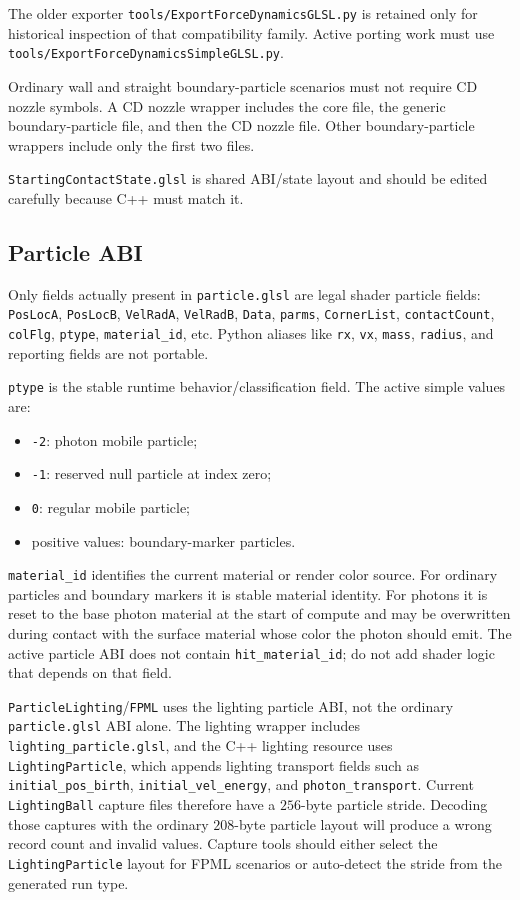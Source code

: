 The older exporter \texttt{tools/ExportForceDynamicsGLSL.py} is retained only
for historical inspection of that compatibility family.  Active porting work
must use \texttt{tools/ExportForceDynamicsSimpleGLSL.py}.

Ordinary wall and straight boundary-particle scenarios must not require CD
nozzle symbols.  A CD nozzle wrapper includes the core file, the generic
boundary-particle file, and then the CD nozzle file.  Other boundary-particle
wrappers include only the first two files.

\texttt{StartingContactState.glsl} is shared ABI/state layout and should be
edited carefully because C++ must match it.

\subsection{Particle ABI}

Only fields actually present in \texttt{particle.glsl} are legal shader
particle fields: \texttt{PosLocA}, \texttt{PosLocB}, \texttt{VelRadA},
\texttt{VelRadB},
\texttt{Data}, \texttt{parms}, \texttt{CornerList}, \texttt{contactCount},
\texttt{colFlg}, \texttt{ptype}, \texttt{material\_id}, etc.  Python aliases like \texttt{rx}, \texttt{vx},
\texttt{mass}, \texttt{radius}, and reporting fields are not portable.

\texttt{ptype} is the stable runtime behavior/classification field.  The
active simple values are:
\begin{itemize}
    \item \texttt{-2}: photon mobile particle;
    \item \texttt{-1}: reserved null particle at index zero;
    \item \texttt{0}: regular mobile particle;
    \item positive values: boundary-marker particles.
\end{itemize}
\texttt{material\_id} identifies the current material or render color source.
For ordinary particles and boundary markers it is stable material identity.
For photons it is reset to the base photon material at the start of compute
and may be overwritten during contact with the surface material whose color
the photon should emit.  The active particle ABI does not contain
\texttt{hit\_material\_id}; do not add shader logic that depends on that
field.

\texttt{ParticleLighting}/\texttt{FPML} uses the lighting particle ABI, not
the ordinary \texttt{particle.glsl} ABI alone.  The lighting wrapper includes
\texttt{lighting\_particle.glsl}, and the C++ lighting resource uses
\texttt{LightingParticle}, which appends lighting transport fields such as
\texttt{initial\_pos\_birth}, \texttt{initial\_vel\_energy}, and
\texttt{photon\_transport}.  Current \texttt{LightingBall} capture files
therefore have a \(256\)-byte particle stride.  Decoding those captures with
the ordinary \(208\)-byte particle layout will produce a wrong record count
and invalid values.  Capture tools should either select the
\texttt{LightingParticle} layout for FPML scenarios or auto-detect the stride
from the generated run type.

